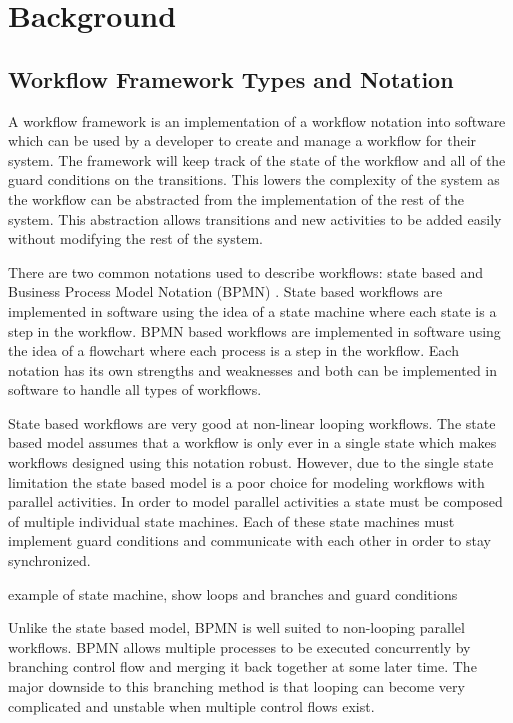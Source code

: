 \documentclass[document.tex]{subfiles}
\begin{document}
\chapter {Background}
\label {ch:background}


\section {Workflow Framework Types and Notation}
\label {sec:overview-of-workflows}

A workflow framework is an implementation of a workflow notation into software which can be used by a developer to create and manage a workflow for their system. The framework will keep track of the state of the workflow and all of the guard conditions on the transitions. This lowers the complexity of the system as the workflow can be abstracted from the implementation of the rest of the system. This abstraction allows transitions and new activities to be added easily without modifying the rest of the system.

There are two common notations used to describe workflows: state based and Business Process Model Notation (BPMN) \cite{bpmn}. State based workflows are implemented in software using the idea of a state machine where each state is a step in the workflow. BPMN based workflows are implemented in software using the idea of a flowchart where each process is a step in the workflow. Each notation has its own strengths and weaknesses and both can be implemented in software to handle all types of workflows.

State based workflows are very good at non-linear looping workflows. The state based model assumes that a workflow is only ever in a single state which makes workflows designed using this notation robust. However, due to the single state limitation the state based model is a poor choice for modeling workflows with parallel activities. In order to model parallel activities a state must be composed of multiple individual state machines. Each of these state machines must implement guard conditions and communicate with each other in order to stay synchronized.

\todo example of state machine, show loops and branches and guard conditions

Unlike the state based model, BPMN is well suited to non-looping parallel workflows. BPMN allows multiple processes to be executed concurrently by branching  control flow and merging it back together at some later time. The major downside to this branching method is that looping can become very complicated and unstable when multiple control flows exist.
\end{document}
